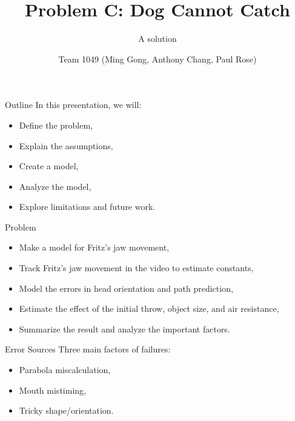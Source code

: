 \documentclass[compress,12pt,mp]{beamer}
\title{Problem C: Dog Cannot Catch}
\subtitle{A solution}
\date{}
\author{Team 1049 (Ming Gong, Anthony Chang, Paul Rose)}
\institute{Bard College at Simon's Rock}
\begin{document}
\frame[plain]{\titlepage}

\begin{frame}[t]{Outline}
In this presentation, we will:
\begin{itemize}
\item Define the problem,
\item Explain the assumptions,
\item Create a model,
\item Analyze the model,
\item Explore limitations and future work.
\end{itemize}
\end{frame}

\begin{frame}[t]{Problem}
\begin{itemize}
    \item Make a model for Fritz's jaw movement,
    \item Track Fritz's jaw movement in the video to estimate constants,
    \item Model the errors in head orientation and path prediction,
    \item Estimate the effect of the initial throw, object size, and air resistance,
    \item Summarize the result and analyze the important factors. 
\end{itemize}

\end{frame}
\begin{frame}{Error Sources}
Three main factors of failures:
    \begin{itemize}
        \item Parabola miscalculation,
        \item Mouth mistiming,
        \item Tricky shape/orientation.
    \end{itemize}
    
    \begin{columns}
        \begin{column}{0.3\linewidth}
            \centering
        \end{column}
        \hfill
        \begin{column}{0.3\linewidth}
            \centering
            
        \end{column}
        \hfill
        \begin{column}{0.3\linewidth}
            \centering
        \end{column}
    \end{columns}
\end{frame}
\end{document}
